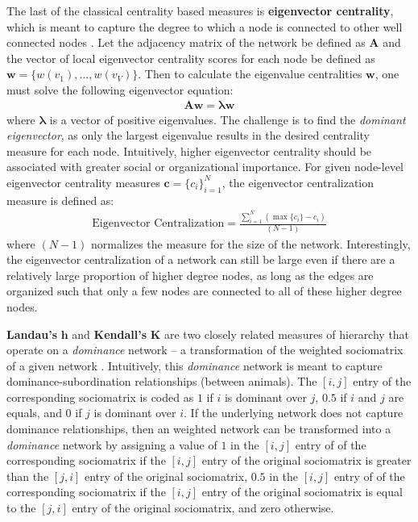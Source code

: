 \documentclass[3p,times]{elsarticle}
\begin{document}
The last of the classical centrality based measures is \textbf{eigenvector centrality}, which is meant to capture the degree to which a node is connected to other well connected nodes \cite{eigen}. Let the adjacency matrix of the network be defined as $\mathbf{A}$ and the vector of local eigenvector centrality scores for each node be defined as $\mathbf{w}=\{w({v_{1}}),...,w(v_{V})\}$. Then to calculate the eigenvalue centralities $\mathbf{w}$, one must solve the following eigenvector equation: 
\begin{align}
	\mathbf{A}  \mathbf{w}=  \mathbf{\lambda} \mathbf{w}
\end{align}
where $\mathbf{\lambda}$ is a vector of positive eigenvalues. The challenge is to find the \emph{dominant eigenvector}, as only the largest eigenvalue results in the desired centrality measure for each node. Intuitively, higher eigenvector centrality should be associated with greater social or organizational importance. For given node-level eigenvector centrality measures $\mathbf{c} = \{c_i\}_{i=1}^N$, the eigenvector centralization measure is defined as: 
\begin{align}
	\text{Eigenvector Centralization} = \frac{\sum_{i=1}^{N}{(\max\{c_{i}\}-c_{i})}}{(N-1)}
\end{align}
where $(N-1)$ normalizes the measure for the size of the network. Interestingly, the eigenvector centralization of a network can still be large even if there are a relatively large proportion of higher degree nodes, as long as the edges are organized such that only a few nodes are connected to all of these higher degree nodes.


\textbf{Landau's} $\mathbf{h}$ and \textbf{Kendall's} $\mathbf{K}$ are two closely related measures of hierarchy that operate on a \emph{dominance} network -- a transformation of the weighted sociomatrix of a given network \cite{animals}. Intuitively, this \emph{dominance} network is meant to capture dominance-subordination relationships (between animals). The $[i,j]$ entry of the corresponding sociomatrix is coded as $1$ if $i$ is dominant over $j$, $0.5$ if $i$ and $j$ are equals, and $0$ if $j$ is dominant over $i$. If the underlying network does not capture dominance relationships, then an weighted network can be transformed into a \emph{dominance} network by assigning a value of $1$ in the $[i,j]$ entry of of the corresponding sociomatrix if the $[i,j]$ entry of the original sociomatrix is greater than the $[j,i]$ entry of the original sociomatrix, $0.5$ in the $[i,j]$ entry of of the corresponding sociomatrix if the $[i,j]$ entry of the original sociomatrix is equal to the $[j,i]$ entry of the original sociomatrix, and zero otherwise. 
\end{document}
